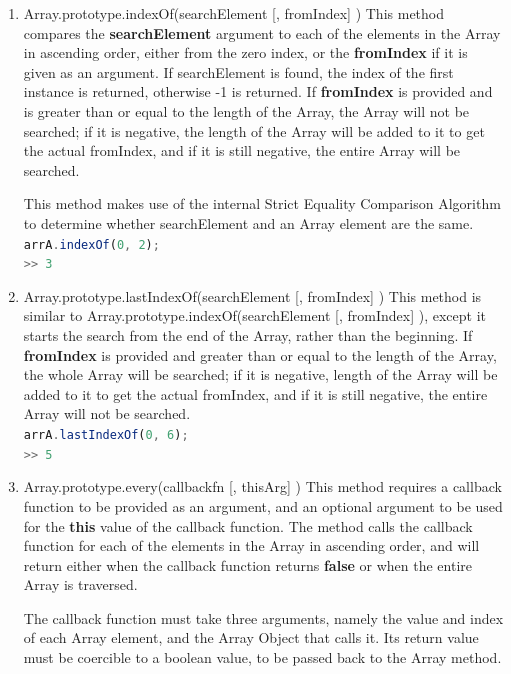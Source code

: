 \documentclass[a4paper,11pt,twoside]{report}
\def\jsinline{\lstinline[language=JavaScript, basicstyle=\small]}
\begin{document}
\begin{enumerate}
\item Array.prototype.indexOf(searchElement [, fromIndex] ) \newline
This method compares the \textbf{searchElement} argument to each of the elements in the Array in ascending order, either from the zero index, or the \textbf{fromIndex} if it is given as an argument. If searchElement is found, the index of the first instance is returned, otherwise -1 is returned. If \textbf{fromIndex} is provided and is greater than or equal to the length of the Array, the Array will not be searched; if it is negative, the length of the Array will be added to it to get the actual fromIndex, and if it is still negative, the entire Array will be searched.

This method makes use of the internal Strict Equality Comparison Algorithm to determine whether searchElement and an Array element are the same.\\
\jsinline|arrA.indexOf(0, 2);|\\
\jsinline|>> 3|

\item Array.prototype.lastIndexOf(searchElement [, fromIndex] ) \newline
This method is similar to Array.prototype.indexOf(searchElement [, fromIndex] ), except it starts the search from the end of the Array, rather than the beginning. If \textbf{fromIndex} is provided and greater than or equal to the length of the Array, the whole Array will be searched; if it is negative, length of the Array will be added to it to get the actual fromIndex, and if it is still negative, the entire Array will not be searched.\\
\jsinline|arrA.lastIndexOf(0, 6);|\\
\jsinline|>> 5|

\item Array.prototype.every(callbackfn [, thisArg] ) \newline
This method requires a callback function to be provided as an argument, and an optional argument to be used for the \textbf{this} value of the callback function. The method calls the callback function for each of the elements in the Array in ascending order, and will return either when the callback function returns \textbf{false} or when the entire Array is traversed.

The callback function must take three arguments, namely the value and index of each Array element, and the Array Object that calls it. Its return value must be coercible to a boolean value, to be passed back to the Array method.


\end{enumerate}
\end{document}
